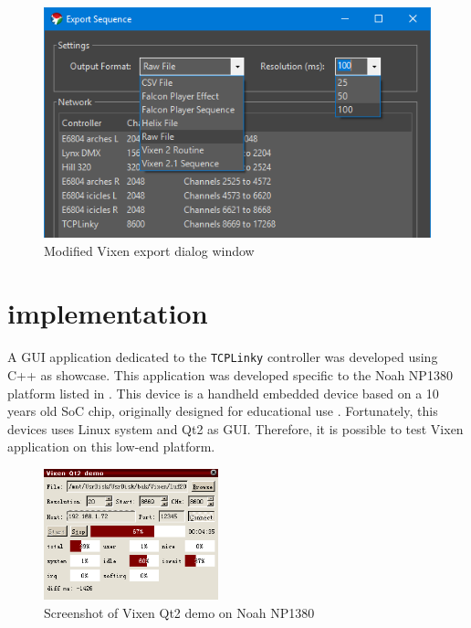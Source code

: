 \begin{figure}[t]
  \centering
  \includegraphics[width=0.75\columnwidth]{Figs/vixen_export.png}
  \caption{\footnotesize Modified Vixen export dialog window}
  \label{fig:vixen_export}
\end{figure}


\newpage

\section{ implementation}

A GUI application dedicated to the \texttt{TCPLinky} controller was developed using C++ as  showcase. This application was developed specific to the Noah NP1380 platform listed in . This device is a handheld embedded device based on a 10 years old SoC chip, originally designed for educational use . Fortunately, this devices uses Linux system and Qt2 as GUI. Therefore, it is possible to test Vixen application on this low-end platform.

\begin{figure}[t]
  \centering
  \includegraphics[width=0.45\textwidth]{Figs/vixen_noah.png}%
  \caption{\footnotesize Screenshot of Vixen Qt2 demo on Noah NP1380}
  \label{fig:vixen_noah}
\end{figure}

